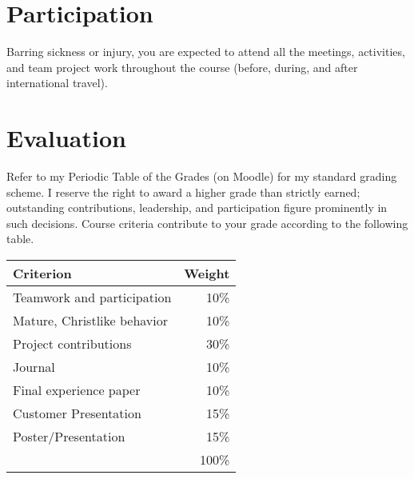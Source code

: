 \documentclass[11pt]{article}
\begin{document}
\section{Participation}

Barring sickness or injury, you are expected
to attend all the meetings, activities, and team project work
throughout the course
(before, during, and after international travel).

\section{Evaluation}

Refer to my Periodic Table of the Grades (on Moodle)
for my standard grading scheme.
I reserve the right to award a higher grade
than strictly earned; outstanding contributions,
leadership, and participation figure prominently in such decisions.
Course criteria contribute to your grade according to the following table.
\begin{center}
  \begin{tabular}{lr}
    \toprule
    Criterion                   & Weight \\
    \midrule
    Teamwork and participation  & 10\%   \\
    Mature, Christlike behavior & 10\%   \\
    \midrule
    Project contributions       & 30\%   \\
    \midrule
    Journal                     & 10\%   \\
    Final experience paper      & 10\%   \\
    Customer Presentation       & 15\%   \\
    Poster/Presentation         & 15\%   \\
    \midrule
                                & 100\%  \\
    \bottomrule
  \end{tabular}
\end{center}

% 

\end{document}
